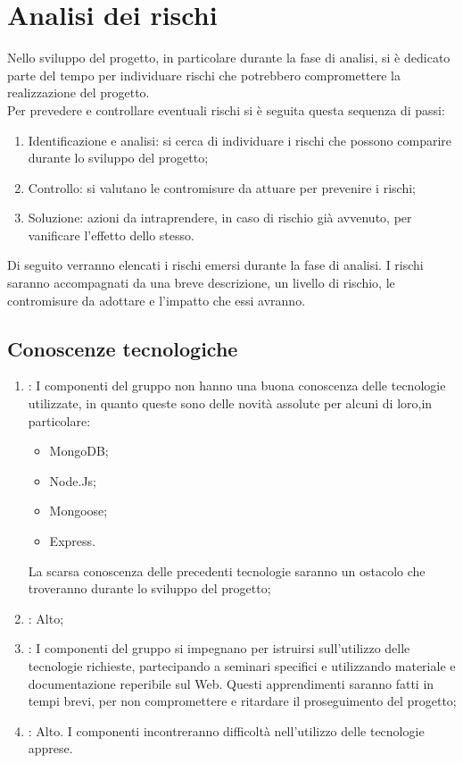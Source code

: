 \section{Analisi dei rischi}
Nello sviluppo del progetto, in particolare durante la fase di analisi, si è dedicato parte del tempo per individuare rischi che potrebbero compromettere la realizzazione del progetto.\\
Per prevedere e controllare eventuali rischi si è seguita questa sequenza di passi:
\begin{enumerate}
\item Identificazione e analisi: si cerca di individuare i rischi che possono comparire durante lo sviluppo del progetto;
\item Controllo: si valutano le contromisure da attuare  per prevenire i rischi;
\item Soluzione: azioni da intraprendere, in caso di rischio già avvenuto, per vanificare l'effetto dello stesso.
\end{enumerate}
Di seguito verranno elencati i rischi emersi durante la fase di analisi. I rischi saranno accompagnati da una breve descrizione, un livello di rischio, le contromisure da adottare e l'impatto che essi avranno.

\subsection{Conoscenze tecnologiche}
\begin{enumerate}
\item {}: I componenti del gruppo non hanno una buona conoscenza delle tecnologie utilizzate, in quanto queste sono delle novità assolute per alcuni di loro,in particolare:
\begin{itemize}
\item MongoDB;
\item Node.Js;
\item Mongoose;
\item Express.
\end{itemize}
La scarsa conoscenza delle precedenti tecnologie  saranno un ostacolo che troveranno durante lo sviluppo del progetto;
\item {}: Alto;
\item {}: I componenti del gruppo si impegnano per istruirsi sull'utilizzo delle tecnologie richieste, partecipando a seminari specifici e utilizzando materiale e documentazione reperibile sul Web. Questi apprendimenti saranno fatti in tempi brevi, per non compromettere  e ritardare il proseguimento del progetto;
\item {}: Alto. I componenti incontreranno difficoltà nell'utilizzo delle tecnologie apprese.
\end{enumerate}


